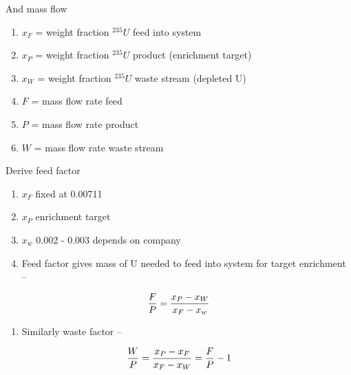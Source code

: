 \documentclass[aspectratio=1610,pdftex,dvipsnames,compress,xcolor={dvipsnames}]{beamer}
\begin{document}
\begin{frame}{And mass flow}
    \begin{enumerate}[topsep=0pt,itemsep=11pt,leftmargin=*,label=(\arabic*)]
        \item[]$x_F$ = weight fraction $^{235}U$ feed into system
        \item[]$x_P$ = weight fraction $^{235}U$ product (enrichment target)
        \item[]$x_W$ = weight fraction $^{235}U$ waste stream (depleted U)
        \item[]$F$ = mass flow rate feed
        \item[]$P$ = mass flow rate product
        \item[]$W$ = mass flow rate waste stream
    \end{enumerate}
\end{frame}


\begin{frame}{Derive feed factor}
    \begin{enumerate}[topsep=0pt,itemsep=11pt,leftmargin=*,label=(\arabic*)]
        \item[]$x_F$ fixed at 0.00711
        \item[]$x_P$ enrichment target
        \item[]$x_w$ 0.002 - 0.003 depends on company
            \vspace{0.10in}
        \item[]Feed factor gives mass of U needed to feed into system for target enrichment  --
    \end{enumerate}

    \vspace*{\fill}

    \begin{equation}
        \LARGE
        \frac{F}{P} = \frac{x_P-x_W}{x_F-x_w}
    \end{equation}
    
    \vspace*{\fill}

    \begin{enumerate}[topsep=0pt,itemsep=11pt,leftmargin=*,label=(\arabic*)]
        \item[]Similarly waste factor --
    \end{enumerate}

    \vspace*{\fill}

    \begin{equation}
        \LARGE
        \frac{W}{P} = \frac{x_P-x_F}{x_F-x_W} = \frac{F}{P} - 1
    \end{equation}
\end{frame}
\end{document}
